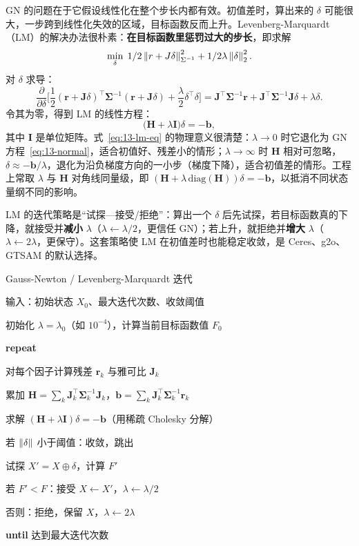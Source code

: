 GN 的问题在于它假设线性化在整个步长内都有效。初值差时，算出来的 $\delta$ 可能很大，一步跨到线性化失效的区域，目标函数反而上升。Levenberg-Marquardt（LM）的解决办法很朴素：\textbf{在目标函数里惩罚过大的步长}，即求解
\begin{equation}
\min_{\delta}\;1/2\left\lVert r+J\delta \right\rVert_{\Sigma^{-1}}^{2}+1/2\lambda\left\lVert \delta \right\rVert_2^{2}.
\label{eq:13-lm-objective}
\end{equation}
对 $\delta$ 求导：
\begin{equation}
\frac{\partial}{\partial\delta}\Big[\frac12(\bm{r}+\bm{J}\delta)^{\top}\bm{\Sigma}^{-1}(\bm{r}+\bm{J}\delta)+\frac{\lambda}{2}\delta^{\top}\delta\Big]
=\bm{J}^{\top}\bm{\Sigma}^{-1}\bm{r}+\bm{J}^{\top}\bm{\Sigma}^{-1}\bm{J}\delta+\lambda\delta .
\end{equation}
令其为零，得到 LM 的线性方程：
\begin{equation}
\big(\bm{H}+\lambda\bm{I}\big)\delta=-\bm{b},
\label{eq:13-lm-eq}
\end{equation}
其中 $\bm{I}$ 是单位矩阵。式~\eqref{eq:13-lm-eq} 的物理意义很清楚：$\lambda\to0$ 时它退化为 GN 方程~\eqref{eq:13-normal}，适合初值好、残差小的情形；$\lambda\to\infty$ 时 $\bm{H}$ 相对可忽略，$\delta\approx-\bm{b}/\lambda$，退化为沿负梯度方向的一小步（梯度下降），适合初值差的情形。工程上常取 $\lambda$ 与 $\bm{H}$ 对角线同量级，即 $(\bm{H}+\lambda\,\mathrm{diag}(\bm{H}))\delta=-\bm{b}$，以抵消不同状态量纲不同的影响。

LM 的迭代策略是``试探—接受/拒绝''：算出一个 $\delta$ 后先试探，若目标函数真的下降，就接受并\textbf{减小} $\lambda$（$\lambda\leftarrow\lambda/2$，更信任 GN）；若上升，就拒绝并\textbf{增大} $\lambda$（$\lambda\leftarrow2\lambda$，更保守）。这套策略使 LM 在初值差时也能稳定收敛，是 Ceres、g2o、GTSAM 的默认选择。

\begin{pseudo}{Gauss-Newton / Levenberg-Marquardt 迭代}
  \item 输入：初始状态 $X_0$、最大迭代次数、收敛阈值
  \item 初始化 $\lambda=\lambda_0$（如 $10^{-4}$），计算当前目标函数值 $F_0$
  \item \textbf{repeat}
  \item \quad 对每个因子计算残差 $\bm{r}_k$ 与雅可比 $\bm{J}_k$
  \item \quad 累加 $\bm{H}=\sum_k\bm{J}_k^{\top}\bm{\Sigma}_k^{-1}\bm{J}_k$，$\bm{b}=\sum_k\bm{J}_k^{\top}\bm{\Sigma}_k^{-1}\bm{r}_k$
  \item \quad 求解 $(\bm{H}+\lambda\bm{I})\delta=-\bm{b}$（用稀疏 Cholesky 分解）
  \item \quad 若 $\left\lVert \delta \right\rVert$ 小于阈值：收敛，跳出
  \item \quad 试探 $X'=X\oplus\delta$，计算 $F'$
  \item \quad 若 $F'<F$：接受 $X\leftarrow X'$，$\lambda\leftarrow\lambda/2$
  \item \quad 否则：拒绝，保留 $X$，$\lambda\leftarrow2\lambda$
  \item \textbf{until} 达到最大迭代次数
\end{pseudo}

